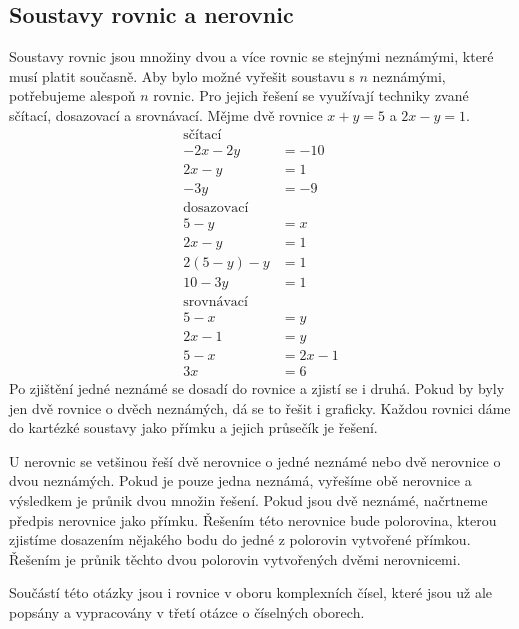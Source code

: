 \documentclass[12pt]{article}
\begin{document}
\subsection*{Soustavy rovnic a nerovnic}
Soustavy rovnic jsou množiny dvou a více rovnic se stejnými neznámými, které musí platit současně.
Aby bylo možné vyřešit soustavu s $n$ neznámými, potřebujeme alespoň $n$ rovnic. Pro jejich řešení
se využívají techniky zvané sčítací, dosazovací a srovnávací. Mějme dvě rovnice $x + y = 5$ a $2x - y
= 1$. 
\[
\begin{aligned}
    \text{sčítací} \\
    -2x - 2y &= -10 \\
    2x - y &= 1 \\
    \hline
    -3y &= -9 \\
    \text{dosazovací} \\
    5 - y &= x \\
    2x - y &= 1 \\
    \hline
    2(5 - y) - y &= 1 \\
    10 -3y &= 1 \\
    \text{srovnávací} \\
    5 - x &= y \\
    2x - 1 &= y \\
    \hline
    5 - x &= 2x - 1 \\
    3x &= 6
\end{aligned}
\]
Po zjištění jedné neznámé se dosadí do rovnice a zjistí se i druhá. Pokud by byly jen dvě rovnice
o dvěch neznámých, dá se to řešit i graficky. Každou rovnici dáme do kartézké soustavy jako přímku
a jejich průsečík je řešení.

U nerovnic se vetšinou řeší dvě nerovnice o jedné neznámé nebo dvě nerovnice o dvou neznámých. Pokud
je pouze jedna neznámá, vyřešíme obě nerovnice a výsledkem je průnik dvou množin řešení. Pokud jsou
dvě neznámé, načrtneme předpis nerovnice jako přímku. Řešením této nerovnice bude polorovina, kterou
zjistíme dosazením nějakého bodu do jedné z polorovin vytvořené přímkou. Řešením je průnik
těchto dvou polorovin vytvořených dvěmi nerovnicemi.

Součástí této otázky jsou i rovnice v oboru komplexních čísel, které jsou už ale popsány a vypracovány
v třetí otázce o číselných oborech.
\end{document}
